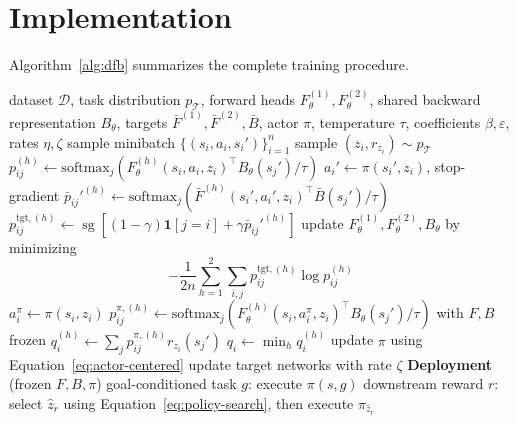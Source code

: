 \documentclass[11pt]{article}
\newcommand{\sg}{\operatorname{sg}}
\begin{document}
\section{Implementation}
\label{sec:implementation}

Algorithm~\ref{alg:dfb} summarizes the complete training procedure.

\begin{algorithm}[h]
\caption{Density-FB}
\label{alg:dfb}
\begin{algorithmic}[1]
\Require dataset $\mathcal D$, task distribution $p_{\mathcal T}$, forward heads $F_\theta^{(1)},F_\theta^{(2)}$, shared backward representation $B_\theta$, targets $\bar F^{(1)},\bar F^{(2)},\bar B$, actor $\pi$, temperature $\tau$, coefficients $\beta,\varepsilon$, rates $\eta,\zeta$
    \State sample minibatch $\{(s_i,a_i,s_i')\}_{i=1}^{n}$
    \State sample $(z_i,r_{z_i})\sim p_{\mathcal T}$
        \State $p_{ij}^{(h)}
        \gets
        \mathrm{softmax}_j
        \left(
            F_\theta^{(h)}(s_i,a_i,z_i)^\top
            B_\theta(s_j')/\tau
        \right)$
    \EndFor
    \State $a_i'\gets\pi(s_i',z_i)$, stop-gradient
        \State $\bar p_{ij}'^{(h)}
        \gets
        \mathrm{softmax}_j
        \left(
            \bar F^{(h)}(s_i',a_i',z_i)^\top
            \bar B(s_j')/\tau
        \right)$
        \State $p_{ij}^{\mathrm{tgt},(h)}
        \gets
        \sg\left[
            (1-\gamma)\mathbf 1[j=i]
            +
            \gamma\bar p_{ij}'^{(h)}
        \right]$
    \EndFor
    \State update $F_\theta^{(1)},F_\theta^{(2)},B_\theta$ by minimizing
    \[
        -\frac{1}{2n}
        \sum_{h=1}^{2}
        \sum_{i,j}
        p_{ij}^{\mathrm{tgt},(h)}
        \log p_{ij}^{(h)}
    \]
    \State $a_i^\pi\gets\pi(s_i,z_i)$
        \State $p_{ij}^{\pi,(h)}
        \gets
        \mathrm{softmax}_j
        \left(
            F_\theta^{(h)}(s_i,a_i^\pi,z_i)^\top
            B_\theta(s_j')/\tau
        \right)$ with $F,B$ frozen
        \State $q_i^{(h)}
        \gets
        \sum_j
        p_{ij}^{\pi,(h)}
        r_{z_i}(s_j')$
    \EndFor
    \State $q_i\gets\min_h q_i^{(h)}$
    \State update $\pi$ using Equation~\eqref{eq:actor-centered}
    \State update target networks with rate $\zeta$
\EndFor
\Statex
\Statex \textbf{Deployment} (frozen $F,B,\pi$)
\State goal-conditioned task $g$: execute $\pi(s,g)$
\State downstream reward $r$: select $\hat z_r$ using Equation~\eqref{eq:policy-search}, then execute $\pi_{\hat z_r}$
\end{algorithmic}
\end{algorithm}
\end{document}
